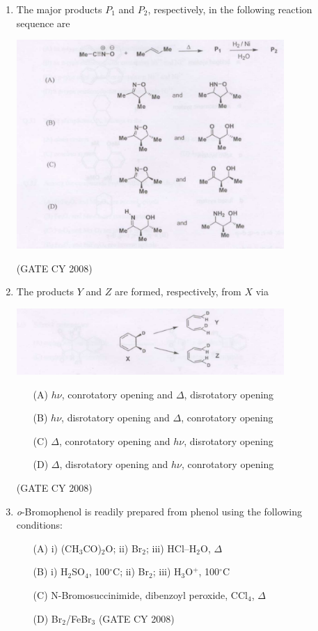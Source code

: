 \documentclass[12pt]{article}
\begin{document}
\begin{enumerate}
\item The major products $P_1$ and $P_2$, respectively, in the following reaction sequence are

\begin{center}
    \includegraphics[width=0.8\textwidth]{figs/q39.png}
\end{center}    \hfill{(GATE CY 2008)}


\item The products $Y$ and $Z$ are formed, respectively, from $X$ via

\begin{center}
    \includegraphics[width=0.8\textwidth]{figs/q40.png}
\end{center}
\begin{enumerate}
    \item [(A)]$h\nu$, conrotatory opening and $\Delta$, disrotatory opening
    \item [(B)]$h\nu$, disrotatory opening and $\Delta$, conrotatory opening
    \item [(C)]$\Delta$, conrotatory opening and $h\nu$, disrotatory opening
    \item [(D)]$\Delta$, disrotatory opening and $h\nu$, conrotatory opening
\end{enumerate}    \hfill{(GATE CY 2008)}



\item \textit{o}-Bromophenol is readily prepared from phenol using the following conditions:
\begin{enumerate}
\item[(A)] i) (CH$_3$CO)$_2$O; \quad ii) Br$_2$; \quad iii) HCl–H$_2$O, $\Delta$
\item[(B)] i) H$_2$SO$_4$, 100$^\circ$C; \quad ii) Br$_2$; \quad iii) H$_3$O$^+$, 100$^\circ$C
\item[(C)] N-Bromosuccinimide, dibenzoyl peroxide, CCl$_4$, $\Delta$
\item[(D)] Br$_2$/FeBr$_3$    \hfill{(GATE CY 2008)}
\end{enumerate}



\end{enumerate}
\end{document}
